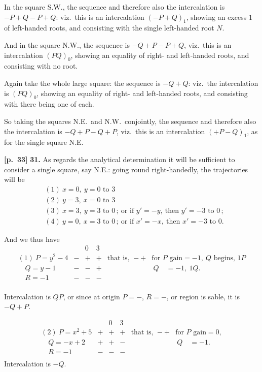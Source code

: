 \documentclass[11pt,a4paper]{article}
\begin{document}
In the square S.W., the sequence and therefore also the intercalation is $-P+Q-P+Q$: viz.\ this is an intercalation $(-P+Q)_{1}$, showing an excess $1$ of left-handed roots, and consisting with the single left-handed root $N$.

And in the square N.W., the sequence is $-Q+P-P+Q$, viz.\ this is an intercalation $(PQ)_{0}$, showing an equality of right- and left-handed roots, and consisting with no root.

Again take the whole large square: the sequence is $-Q+Q$: viz.\ the intercalation is $(PQ)_{0}$, showing an equality of right- and left-handed roots, and consisting with there being one of each.

So taking the squares N.E.\ and N.W.\ conjointly, the sequence and therefore also the intercalation is $-Q+P-Q+P$, viz.\ this is an intercalation $(+P-Q)_{1}$, as for the single square N.E.

\bigskip

\noindent\textbf{[p.~33]}\quad
\noindent\textbf{31.} As regards the analytical determination it will be sufficient to consider a single square, say N.E.: going round right-handedly, the trajectories will be
\begin{align*}
&(1)\ x=0,\ y=0\text{ to }3 \\
&(2)\ y=3,\ x=0\text{ to }3 \\
&(3)\ x=3,\ y=3\text{ to }0\,;\ \text{or if }y'=-y,\ \text{then }y'=-3\text{ to }0\,; \\
&(4)\ y=0,\ x=3\text{ to }0\,;\ \text{or if }x'=-x,\ \text{then }x'=-3\text{ to }0.
\end{align*}

And we thus have
\[
\begin{array}{l|ccc|cl}
 & & 0 & 3 & & \\\hline
(1)\ P=y^{2}-4 & - & + & + & \text{that is, } -+ & \text{for }P\text{ gain}=-1,\ Q\text{ begins, }1P \\
\quad Q=y-1   & - & - & + & & \ Q\quad =-1,\ 1Q. \\
\quad R=-1    & - & - & - & & \\
\end{array}
\]

Intercalation is $QP$, or since at origin $P=-$, $R=-$, or region is sable, it is $-Q+P$.

\[
\begin{array}{l|ccc|cl}
 & & 0 & 3 & & \\\hline
(2)\ P=x^{2}+5 & + & + & + & \text{that is, } -+ & \text{for }P\text{ gain}=0, \\
\quad Q=-x+2   & + & + & - & & \ Q\quad =-1. \\
\quad R=-1     & - & - & - & & \\
\end{array}
\]
Intercalation is $-Q$.
\end{document}
